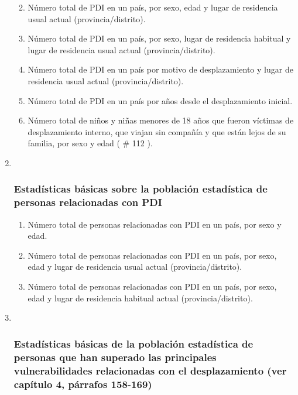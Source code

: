 \documentclass[
]{book}
\providecommand{\tightlist}{%
  \setlength{\itemsep}{0pt}\setlength{\parskip}{0pt}}
\begin{document}
\begin{enumerate}
  \begin{enumerate}
  \def\labelenumii{\arabic{enumii}.}
  \tightlist
  \item
    Número total de PDI en un país, por sexo, edad y lugar de residencia usual actual (provincia/distrito).
  \item
    Número total de PDI en un país, por sexo, lugar de residencia habitual y lugar de residencia usual actual (provincia/distrito).
  \item
    Número total de PDI en un país por motivo de desplazamiento y lugar de residencia usual actual (provincia/distrito).
  \item
    Número total de PDI en un país por años desde el desplazamiento inicial.
  \item
    Número total de niños y niñas menores de 18 años que fueron víctimas de desplazamiento interno, que viajan sin compañía y que están lejos de su familia, por sexo y edad (
    \# 112
    ).
  \end{enumerate}
\item ~
  \hypertarget{estaduxedsticas-buxe1sicas-sobre-la-poblaciuxf3n-estaduxedstica-de-personas-relacionadas-con-pdi}{%
  \subsubsection{Estadísticas básicas sobre la población estadística de personas relacionadas con PDI}\label{estaduxedsticas-buxe1sicas-sobre-la-poblaciuxf3n-estaduxedstica-de-personas-relacionadas-con-pdi}}

  \begin{enumerate}
  \def\labelenumii{\arabic{enumii}.}
  \tightlist
  \item
    Número total de personas relacionadas con PDI en un país, por sexo y edad.
  \item
    Número total de personas relacionadas con PDI en un país, por sexo, edad y lugar de residencia usual actual (provincia/distrito).
  \item
    Número total de personas relacionadas con PDI en un país, por sexo, edad y lugar de residencia habitual actual (provincia/distrito).
  \end{enumerate}
\item ~
  \hypertarget{estaduxedsticas-buxe1sicas-de-la-poblaciuxf3n-estaduxedstica-de-personas-que-han-superado-las-principales-vulnerabilidades-relacionadas-con-el-desplazamiento-ver-capuxedtulo-4-puxe1rrafos-158-169}{%
  \subsubsection{Estadísticas básicas de la población estadística de personas que han superado las principales vulnerabilidades relacionadas con el desplazamiento (ver capítulo 4, párrafos 158-169)}\label{estaduxedsticas-buxe1sicas-de-la-poblaciuxf3n-estaduxedstica-de-personas-que-han-superado-las-principales-vulnerabilidades-relacionadas-con-el-desplazamiento-ver-capuxedtulo-4-puxe1rrafos-158-169}}


\end{enumerate}
\end{document}
